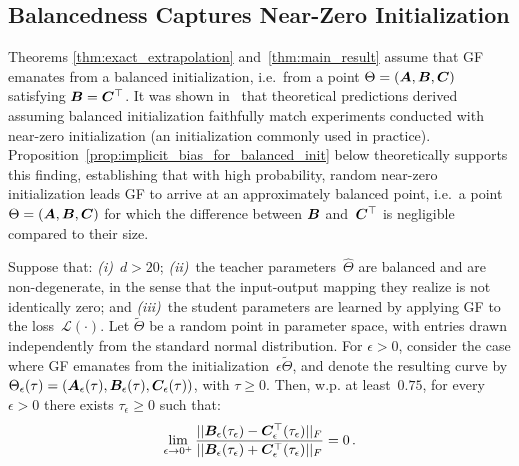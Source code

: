 \subsection{Balancedness Captures Near-Zero Initialization}
\label{sec:relaxed_balanced_assumption}

Theorems \ref{thm:exact_extrapolation} and~\ref{thm:main_result} assume that GF emanates from a balanced initialization, i.e.~from a point $\Theta = ( {\bm{A}} , {\bm{B}} , {\bm{C}} )$ satisfying ${\bm{B}} = {\bm{C}}^\top$.
It was shown in~\cite{cohen2022extrapolation} that theoretical predictions derived assuming balanced initialization faithfully match experiments conducted with near-zero initialization (an initialization commonly used in practice).
Proposition~\ref{prop:implicit_bias_for_balanced_init} below theoretically supports this finding, establishing that with high probability, random near-zero initialization leads GF to arrive at an approximately balanced point, i.e.~a point $\Theta = ( {\bm{A}} , {\bm{B}} , {\bm{C}} )$ for which the difference between ${\bm{B}}$ and~${\bm{C}}^\top$ is negligible compared to their size.
\begin{proposition}\label{prop:implicit_bias_for_balanced_init}
Suppose that:
\emph{(i)}~$d > 20$;
\emph{(ii)}~the teacher parameters~$\hat{\Theta}$ are balanced and are non-degenerate, in the sense that the input-output mapping they realize is not identically zero;
and 
\emph{(iii)}~the student parameters are learned by applying GF to the loss~$\mathcal{L} ( \cdot )$.
Let $\tilde{\Theta}$ be a random point in parameter space, with entries drawn independently from the standard normal distribution.
For $\epsilon > 0$, consider the case where GF emanates from the initialization~$\epsilon \tilde{\Theta}$, and denote the resulting curve by $\Theta_\epsilon ( \tau ) = ( {\bm{A}}_\epsilon ( \tau ) , {\bm{B}}_\epsilon ( \tau ) , {\bm{C}}_\epsilon ( \tau ) )$, with $\tau \geq 0$.
Then, w.p. at least~$0.75$, for every $\epsilon > 0$ there exists $\tau_\epsilon \geq 0$ such that:
\begin{equation}
    \lim_{\epsilon\rightarrow 0^+}\frac{||{\bm{B}}_{\epsilon}(\tau_\epsilon) - {\bm{C}}_{\epsilon}^\top(\tau_\epsilon) ||_F}{||{\bm{B}}_{\epsilon}(\tau_\epsilon) + {\bm{C}}_{\epsilon}^\top(\tau_\epsilon) ||_F}=0
    \text{\,.}
\end{equation}
\end{proposition}
